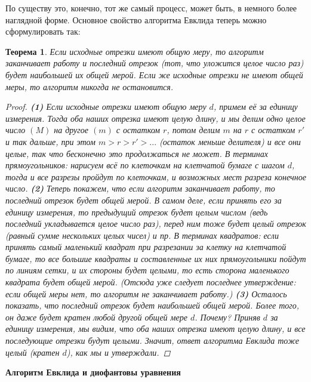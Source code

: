 \documentclass{article}
\newtheorem{theorem}{Теорема}
\begin{document}
По существу это, конечно, тот же самый процесс, может быть, в немного более наглядной форме.
\newline
Основное свойство алгоритма Евклида теперь можно сформулировать так:
\begin{theorem}
Если исходные отрезки имеют общую меру, то алгоритм заканчивает работу и последний отрезок (тот, что уложится целое число раз) будет наибольшей их общей мерой. Если же исходные отрезки не имеют общей меры, то алгоритм никогда не остановится.
\begin{proof}
\textbf{(1) } Если исходные отрезки имеют общую меру $d$, примем её за единицу измерения. Тогда оба наших отрезка имеют целую длину, и мы делим одно целое число $(M)$ на другое $(m)$ с остатком $r$, потом делим $m$ на $r$ с остатком $r'$ и так дальше, при этом $m > r > r' > ...$ (остаток меньше делителя) и все они целые, так что бесконечно это продолжаться не может. В терминах прямоугольников: нарисуем всё по клеточкам на клетчатой бумаге с шагом $d$, тогда и все разрезы пройдут по клеточкам, и возможных мест разреза конечное число.
\newline
\newline
\textbf{(2) } Теперь покажем, что если алгоритм заканчивает работу, то последний отрезок будет общей мерой. В самом деле, если принять его за единицу измерения, то предыдущий отрезок будет целым числом (ведь последний укладывается целое число раз), перед ним тоже будет целый отрезок (равный сумме нескольких целых чисел) и пр. В терминах квадратов: если принять самый маленький квадрат при разрезании за клетку на клетчатой бумаге, то все большие квадраты и составленные их них прямоугольники пойдут по линиям сетки, и их стороны будет целыми, то есть сторона маленького квадрата будет общей мерой. (Отсюда уже следует последнее утверждение: если общей меры нет, то алгоритм не заканчивает работу.)
\newline
\newline
\textbf{(3) } Осталось показать, что последний отрезок будет наибольшей общей мерой. Более того, он даже будет кратен любой другой общей мере $d$. Почему? Приняв $d$ за единицу измерения, мы видим, что оба наших отрезка имеют целую длину, и все последующие отрезки будут целыми. Значит, ответ алгоритма Евклида тоже целый (кратен $d$), как мы и утверждали.
\end{proof}
\end{theorem}
\newline
\newline
\textbf{Алгоритм Евклида и диофантовы уравнения}
\end{document}
